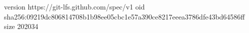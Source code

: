 version https://git-lfs.github.com/spec/v1
oid sha256:09219dc806814708b1b98ee05cbc1e57a390ce8217eeea3786dfe43bd64586ff
size 202034
